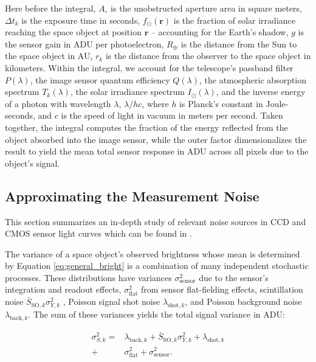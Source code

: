 \documentclass[a4paper,twocolumn]{spaceDebrisC} %
\newcommand{\vctr}[1]{\bm{#1}}
\begin{document}
Here before the integral, $A_\circ$ is the unobstructed aperture area in square meters, $\Delta t_k$ is the exposure time in seconds, $f_\odot(\vctr{r})$ is the fraction of solar irradiance reaching the space object at position $\vctr{r}$ -- accounting for the Earth's shadow, $g$ is the sensor gain in ADU per photoelectron, $R_\oplus$ is the distance from the Sun to the space object in AU, $r_k$ is the distance from the observer to the space object in kilometers. Within the integral, we account for the telescope's passband filter $P(\lambda)$, the image sensor quantum efficiency $Q(\lambda)$, the atmospheric absorption spectrum $T_k(\lambda)$, the solar irradiance spectrum $I_\odot(\lambda)$, and the inverse energy of a photon with wavelength $\lambda$, $\lambda / hc$, where $h$ is Planck's constant in Joule-seconds, and $c$ is the speed of light in vacuum in meters per second. Taken together, the integral computes the fraction of the energy reflected from the object absorbed into the image sensor, while the outer factor dimensionalizes the result to yield the mean total sensor response in ADU across all pixels due to the object's signal.

\subsection{Approximating the Measurement Noise}

This section summarizes an in-depth study of relevant noise sources in CCD and CMOS sensor light curves which can be found in \cite{robinson2025twin}.

The variance of a space object's observed brightness whose mean is determined by Equation \ref{eq:general_bright} is a combination of many independent stochastic processes. These distributions have variances $\sigma^2_\text{sensor}$ due to the sensor's integration and readout effects, $\sigma^2_\text{flat}$ from sensor flat-fielding effects, scintillation noise $\bar{S}_{\text{SO},k} \sigma^2_{Y,k}$ \cite{osborn2015}, Poisson signal shot noise $\lambda_{\text{shot},k}$, and Poisson background noise $\lambda_{\text{back},k}$. The sum of these variances yields the total signal variance in ADU:

\begin{equation} \label{eq:sigma_total}
  \begin{split}
  \sigma^2_{S,k} = &\lambda_{\text{back},k} + \bar{S}_{\text{SO},k} \sigma^2_{Y,k} + \lambda_{\text{shot},k} \\ + &\sigma^2_\text{flat} + \sigma^2_\text{sensor}.
  \end{split}
\end{equation}
\end{document}
